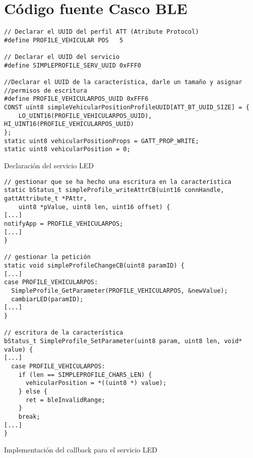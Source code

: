 \section{Código fuente Casco BLE}
\begin{listing}
		\begin{minipage}{.4\textwidth}
			\begin{verbatim}
// Declarar el UUID del perfil ATT (Atribute Protocol)
#define PROFILE_VEHICULAR POS   5

// Declarar el UUID del servicio
#define SIMPLEPROFILE_SERV_UUID 0xFFF0

//Declarar el UUID de la característica, darle un tamaño y asignar 
//permisos de escritura
#define PROFILE_VEHICULARPOS_UUID 0xFFF6
CONST uint8 simpleVehicularPositionProfileUUID[ATT_BT_UUID_SIZE] = {
	LO_UINT16(PROFILE_VEHICULARPOS_UUID), HI_UINT16(PROFILE_VEHICULARPOS_UUID)	
};
static uint8 vehicularPositionProps = GATT_PROP_WRITE;
static uint8 vehicularPosition = 0;
		\end{verbatim}
	\end{minipage}
	\caption{Declaración del servicio LED}\label{alg:mota1}
\end{listing}

\begin{listing}
	\begin{minipage}{.4\textwidth}
		\begin{verbatim}
// gestionar que se ha hecho una escritura en la característica
static bStatus_t simpleProfile_writeAttrCB(uint16 connHandle, gattAttribute_t *PAttr,
    uint8 *pValue, uint8 len, uint16 offset) {
[...]    	
notifyApp = PROFILE_VEHICULARPOS;
[...]
}

// gestionar la petición
static void simpleProfileChangeCB(uint8 paramID) {
[...]
case PROFILE_VEHICULARPOS:
  SimpleProfile_GetParameter(PROFILE_VEHICULARPOS, &newValue);
  cambiarLED(paramID);
[...]	
}

// escritura de la característica
bStatus_t SimpleProfile_SetParameter(uint8 param, uint8 len, void* value) {
[...]	
  case PROFILE_VEHICULARPOS:
    if (len == SIMPLEPROFILE_CHAR5_LEN) {
      vehicularPosition = *((uint8 *) value);	
    } else {
      ret = bleInvalidRange;
    }
    break;
[...]
}
		\end{verbatim}
	\end{minipage}
	\caption{Implementación del callback para el servicio LED}\label{alg:mota2}
\end{listing}